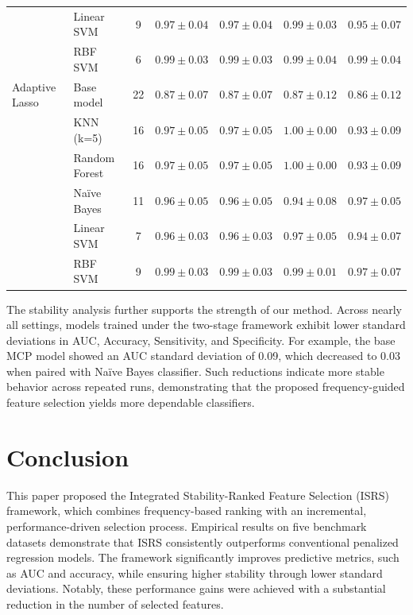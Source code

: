 \documentclass[twoside]{article}
\begin{document}
\begin{table}[h!]
\begin{tabular}{|l|l|ccccc|}
			& Linear SVM    & 9  & $0.97 \pm 0.04$ & $0.97 \pm 0.04$ & $0.99 \pm 0.03$ & $0.95 \pm 0.07$ \\
			& RBF SVM       & 6  & $0.99 \pm 0.03$ & $0.99 \pm 0.03$ & $0.99 \pm 0.04$ & $0.99 \pm 0.04$ \\
			\hline
		{Adaptive Lasso}
			& Base model    & 22 & $0.87 \pm 0.07$ & $0.87 \pm 0.07$ & $0.87 \pm 0.12$ & $0.86 \pm 0.12$ \\
			& KNN (k=5)     & 16 & $0.97 \pm 0.05$ & $0.97 \pm 0.05$ & $1.00 \pm 0.00$ & $0.93 \pm 0.09$ \\
			& Random Forest & 16 & $0.97 \pm 0.05$ & $0.97 \pm 0.05$ & $1.00 \pm 0.00$ & $0.93 \pm 0.09$ \\
			& Naïve Bayes   & 11 & $0.96 \pm 0.05$ & $0.96 \pm 0.05$ & $0.94 \pm 0.08$ & $0.97 \pm 0.05$ \\
			& Linear SVM    & 7  & $0.96 \pm 0.03$ & $0.96 \pm 0.03$ & $0.97 \pm 0.05$ & $0.94 \pm 0.07$ \\
			& RBF SVM       & 9  & $0.99 \pm 0.03$ & $0.99 \pm 0.03$ & $0.99 \pm 0.01$ & $0.97 \pm 0.07$ \\
			\hline
		\end{tabular}
	\end{table}
	
	The stability analysis further supports the strength of our method. Across nearly all settings, models trained under the two-stage framework exhibit lower standard deviations in AUC, Accuracy, Sensitivity, and Specificity. For example, the base MCP model showed an AUC standard deviation of 0.09, which decreased to 0.03 when paired with Na\"ive Bayes classifier. Such reductions indicate more stable behavior across repeated runs, demonstrating that the proposed frequency-guided feature selection yields more dependable classifiers.









\section{Conclusion}
This paper proposed the Integrated Stability-Ranked Feature Selection (ISRS) framework, which combines frequency-based ranking with an incremental, performance-driven selection process. Empirical results on five benchmark datasets demonstrate that ISRS consistently outperforms conventional penalized regression models. The framework significantly improves predictive metrics, such as AUC and accuracy, while ensuring higher stability through lower standard deviations. Notably, these performance gains were achieved with a substantial reduction in the number of selected features.
   
\end{document}
